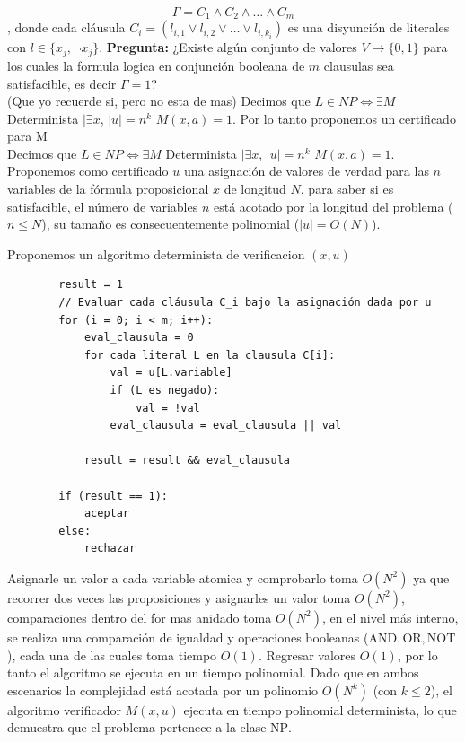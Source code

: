 \begin{enumerate}[label=\arabic*., leftmargin=*]
    $$\Gamma = C_1 \wedge C_2 \wedge \dots \wedge C_m$$, donde cada cláusula $C_i = (l_{i,1} \vee l_{i,2} \vee \dots \vee l_{i,k_i})$ es una disyunción de literales con $l \in \{x_j, \neg x_j\}$.
    \textbf{Pregunta:} ¿Existe algún conjunto de valores $V \rightarrow \{0,1\}$ para los cuales la formula logica en conjunción booleana de $m$ clausulas sea satisfacible, es decir $\Gamma = 1$?\\
    
    (Que yo recuerde si, pero no esta de mas)
    Decimos que $L \in NP \iff \exists M$ Determinista $| \exists x $, $|u| = n^k$  $M(x,a) = 1$. Por lo tanto proponemos un certificado para M\\

    Decimos que $L \in NP \iff \exists M$ Determinista $| \exists x $, $|u| = n^k$  $M(x,a) = 1$.\\

    Proponemos como certificado $u$ una asignación de valores de verdad para las $n$ variables de la fórmula proposicional $x$ de longitud $N$, para saber si es satisfacible, el número de variables $n$ está acotado por la longitud del problema ($n \le N$), su tamaño es consecuentemente polinomial ($\vert{}u\vert{} = O(N)$).

    Proponemos un algoritmo determinista de verificacion $(x,u)$ 
    \begin{verbatim}
        result = 1
        // Evaluar cada cláusula C_i bajo la asignación dada por u
        for (i = 0; i < m; i++):
            eval_clausula = 0
            for cada literal L en la clausula C[i]:
                val = u[L.variable]
                if (L es negado):
                    val = !val
                eval_clausula = eval_clausula || val
            
            result = result && eval_clausula
        
        if (result == 1):
            aceptar
        else:
            rechazar
    \end{verbatim}
    
    Asignarle un valor a cada variable atomica y comprobarlo toma $O(N^2)$ ya que recorrer dos veces las proposiciones y asignarles un valor toma $O(N^2)$, comparaciones dentro del for mas anidado toma $O(N^2)$, en el nivel más interno, se realiza una comparación de igualdad y operaciones booleanas ($\text{AND}, \text{OR}, \text{NOT}$), cada una de las cuales toma tiempo $O(1)$.
    Regresar valores $O(1)$, por lo tanto el algoritmo se ejecuta en un tiempo polinomial. Dado que en ambos escenarios la complejidad está acotada por un polinomio $O(N^k)$ (con $k \le 2$), el algoritmo verificador $M(x, u)$ ejecuta en tiempo polinomial determinista, lo que demuestra que el problema pertenece a la clase $\text{NP}$.\\
    

\end{enumerate}
